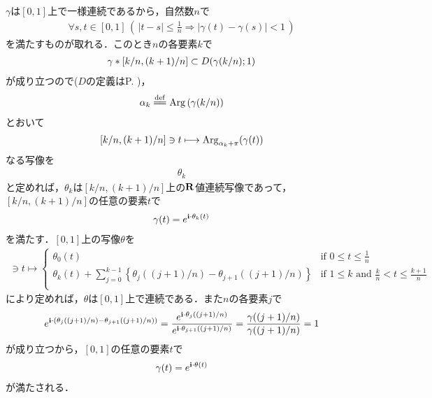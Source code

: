 	\begin{sketch}
		$\gamma$は$[0,1]$上で一様連続であるから，自然数$n$で
		\begin{align}
			\forall s,t \in [0,1]\, \left(\, |t-s| \leq \frac{1}{n} \Longrightarrow |\gamma(t) - \gamma(s)| < 1\, \right)
		\end{align}
		を満たすものが取れる．このとき$n$の各要素$k$で
		\begin{align}
			\gamma \ast \left[k/n,(k+1)/n\right] \subset D(\gamma(k/n);1)
		\end{align}
		が成り立つので($D$の定義はP. \pageref{definition_of_disc_on_plane})，
		\begin{align}
			\alpha_{k} \defeq \pvarg{(\gamma(k/n))}
		\end{align}
		とおいて
		\begin{align}
			\left[k/n,(k+1)/n\right] \ni t \longmapsto \operatorname{Arg}_{\alpha_{k} + \pi}(\gamma(t))
		\end{align}
		なる写像を
		\begin{align}
			\theta_{k}
		\end{align}
		と定めれば，$\theta_{k}$は$\left[k/n,(k+1)/n\right]$上の$\mathbf{R}$値連続写像であって，
		$\left[k/n,(k+1)/n\right]$の任意の要素$t$で
		\begin{align}
			\gamma(t) = e^{\mathbf{i} \cdot \theta_{k}(t)}
		\end{align}
		を満たす．$[0,1]$上の写像$\theta$を
		\begin{align}
			[0,1] \ni t \longmapsto
			\begin{cases}
				\theta_{0}(t) & \mbox{if } {\displaystyle 0 \leq t \leq \frac{1}{n}} \\
				{\displaystyle \theta_{k}(t) + \sum_{j=0}^{k-1} \left\{\theta_{j}((j+1)/n) - \theta_{j+1}((j+1)/n)\right\}}
				& \mbox{if } 1 \leq k \mbox{ and } {\displaystyle \frac{k}{n} < t \leq \frac{k+1}{n}} \\
			\end{cases}
		\end{align}
		により定めれば，$\theta$は$[0,1]$上で連続である．また$n$の各要素$j$で
		\begin{align}
			e^{\mathbf{i} \cdot \left(\theta_{j}((j+1)/n) - \theta_{j+1}((j+1)/n)\right)}
			= \frac{e^{\mathbf{i} \cdot \theta_{j}((j+1)/n)}}{e^{\mathbf{i} \cdot \theta_{j+1}((j+1)/n)}}
			= \frac{\gamma((j+1)/n)}{\gamma((j+1)/n)}
			= 1
		\end{align}
		が成り立つから，$[0,1]$の任意の要素$t$で
		\begin{align}
			\gamma(t) = e^{\mathbf{i} \cdot \theta(t)}
		\end{align}
		が満たされる．
		\QED
	\end{sketch}
	

